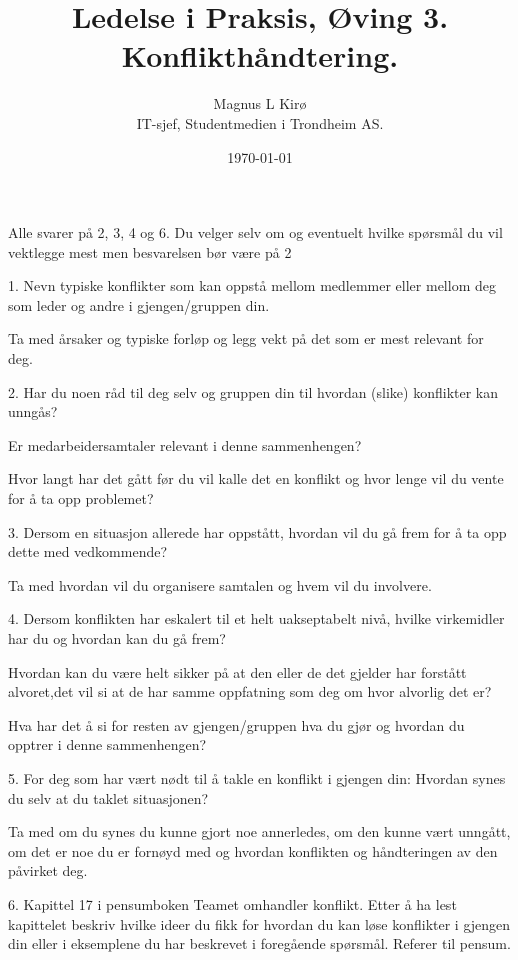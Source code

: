 \documentclass[12pt, a4paper]{article}
\title{
	Ledelse i Praksis, Øving 3. Konflikthåndtering. 
}
\author{
	Magnus L Kirø \\
	IT-sjef, Studentmedien i Trondheim AS. 
}
\date{\today}
\begin{document}
\maketitle
{}

Alle svarer på 2, 3, 4 og 6. Du velger selv om og eventuelt hvilke
spørsmål du vil vektlegge mest men besvarelsen bør være på 2

1.
Nevn typiske konflikter som kan oppstå mellom medlemmer eller mellom deg som
leder og andre i gjengen/gruppen din. 


Ta med årsaker og typiske forløp og legg vekt på
det som er mest relevant for deg.

2.
Har du noen råd til deg selv og gruppen din til hvordan (slike) konflikter kan
unngås? 

Er medarbeidersamtaler relevant i denne sammenhengen? 

Hvor langt har det gått før du vil kalle det en konflikt og hvor lenge vil du 
vente for å ta opp problemet?

3.
Dersom en situasjon allerede har oppstått, hvordan vil du gå frem for å ta opp
dette med vedkommende? 

Ta med hvordan vil du organisere samtalen og hvem vil du involvere.

4.
Dersom konflikten har eskalert til et helt uakseptabelt nivå, hvilke virkemidler 
har du og hvordan kan du gå frem? 

Hvordan kan du være helt sikker på at den eller de det gjelder har forstått
alvoret,det vil si at de har samme oppfatning som deg om hvor alvorlig det er?

Hva har det å si for resten av gjengen/gruppen hva du gjør og hvordan du
opptrer i denne sammenhengen?

5.
For deg som har vært nødt til å takle en konflikt i gjengen din: Hvordan synes
du selv at du taklet situasjonen? 

Ta med om du synes du kunne gjort noe annerledes, om den kunne
vært unngått, om det er noe du er fornøyd med og hvordan konflikten og
håndteringen av den påvirket deg.

6.
Kapittel 17 i pensumboken Teamet omhandler konflikt. Etter å ha lest kapittelet
beskriv hvilke ideer du fikk for hvordan du kan løse konflikter i gjengen din eller i eksemplene
du har beskrevet i foregående spørsmål. Referer til pensum.
\end{document}
